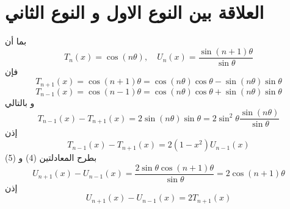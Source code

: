 \section{العلاقة بين النوع الاول و النوع الثاني}
بما أن 
\[
T_n(x) = \cos(n \theta), \quad U_n(x) = \frac{\sin(n+1)\theta}{\sin\theta}
\]
فإن
\[
T_{n+1}(x) = \cos(n+1)\theta = \cos(n\theta)\cos\theta - \sin(n\theta)\sin\theta 
\]
\[
T_{n-1}(x) = \cos(n-1)\theta = \cos(n\theta)\cos\theta + \sin(n\theta)\sin\theta 
\]
و بالتالي
\[
T_{n-1}(x) - T_{n+1}(x) = 2 \sin(n\theta) \sin\theta = 2 \sin^2\theta \frac{\sin(n\theta)}{\sin\theta} 
\]
إذن 
\begin{equation}
	T_{n-1}(x) - T_{n+1}(x) = 2 (1-x^2) U_{n-1}(x) 
\end{equation}
بطرح المعادلتين (4) و (5) 
\[
U_{n+1}(x) - U_{n-1}(x) = \frac{2\sin\theta\cos(n+1)\theta}{\sin\theta} = 2 \cos(n+1)\theta
\]
إذن 
\begin{equation}
	U_{n+1}(x) - U_{n-1}(x)  = 2T_{n+1}(x)
\end{equation}



